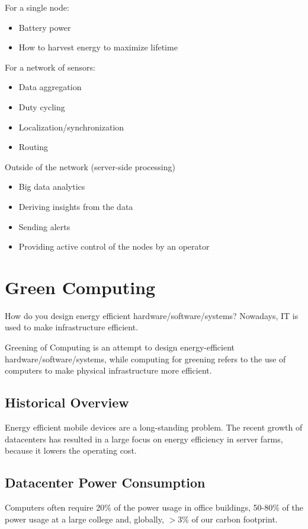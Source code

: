 \documentclass[twoside]{article}
\begin{document}
For a single node:
\begin{itemize}
  \item Battery power
  \item How to harvest energy to maximize lifetime  
\end{itemize}

For a network of sensors:
\begin{itemize}
  \item Data aggregation
  \item Duty cycling
  \item Localization/synchronization
  \item Routing
\end{itemize}

Outside of the network (server-side processing)
\begin{itemize}
  \item Big data analytics
  \item Deriving insights from the data
  \item Sending alerts
  \item Providing active control of the nodes by an operator
\end{itemize}

\section{Green Computing}
How do you design energy efficient hardware/software/systems? Nowadays, IT is used to make infrastructure efficient.

Greening of Computing is an attempt to design energy-efficient hardware/software/systems, while computing for greening refers to the use of computers to make physical infrastructure more efficient.

\subsection{Historical Overview}
Energy efficient mobile devices are a long-standing problem. The recent growth of datacenters has resulted in a large focus on energy efficiency in server farms, because it lowers the operating cost.

\subsection{Datacenter Power Consumption}
Computers often require 20\% of the power usage in office buildings, 50-80\% of the power usage at a large college and, globally, $>$3\% of our carbon footprint.
\end{document}

